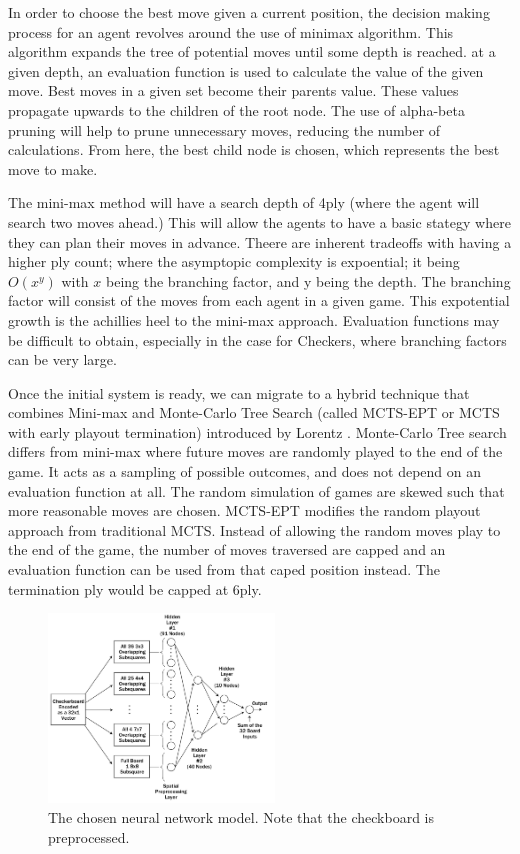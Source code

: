 \documentclass[12pt,a4paper]{article}
\begin{document}
    In order to choose the best move given a current position, the decision making process for an agent revolves around the use of minimax algorithm. This algorithm expands the tree of potential moves until some depth is reached. at a given depth, an evaluation function is used to calculate the value of the given move. Best moves in a given set become their parents value. These values propagate upwards to the children of the root node. The use of alpha-beta pruning will help to prune unnecessary moves,  reducing the number of calculations. From here, the best child node is chosen, which represents the best move to make.

    The mini-max method will have a search depth of 4ply (where the agent will search two moves ahead.) This will allow the agents to have a basic stategy where they can plan their moves in advance. Theere are inherent tradeoffs with having a higher ply count; where the asymptopic complexity is expoential; it being $O(x^y)$ with $x$ being the branching factor, and y being the depth. The branching factor will consist of the moves from each agent in a given game. This expotential growth is the achillies heel to the mini-max approach. Evaluation functions may be difficult to obtain, especially in the case for Checkers, where branching factors can be very large. 

    Once the initial system is ready, we can migrate to a hybrid technique that combines Mini-max and Monte-Carlo Tree Search (called MCTS-EPT or MCTS with early playout termination) introduced by Lorentz \cite{lorentz_using_2016}. Monte-Carlo Tree search differs from mini-max where future moves are randomly played to the end of the game. It acts as a sampling of possible outcomes, and does not depend on an evaluation function at all. The random simulation of games are skewed such that more reasonable moves are chosen. MCTS-EPT modifies the random playout approach from traditional MCTS. Instead of allowing the random moves play to the end of the game, the number of moves traversed are capped and an evaluation function can be used from that caped position instead. The termination ply would be capped at 6ply.
    
    \begin{figure}[ht!]
        \centering
        \caption{The chosen neural network model. Note that the checkboard is preprocessed. \label{overflow}}
        \includegraphics[width=60mm]{nnmodel.png}
    \end{figure}
\end{document}
